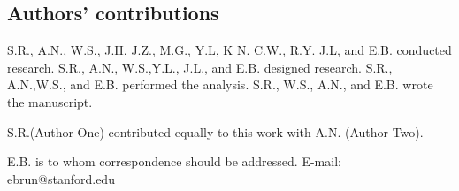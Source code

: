 \documentclass[sn-mathphys,Numbered]{sn-jnl}%
\theoremstyle{thmstyleone}%
\theoremstyle{thmstyletwo}%
\theoremstyle{thmstylethree}%
\begin{document}
\begin{appendices}
\subsection*{Authors' contributions}

S.R., A.N., W.S., J.H. J.Z., M.G., Y.L, K N. C.W., R.Y. J.L, and E.B. conducted  research. S.R., A.N., W.S.,Y.L., J.L., and E.B. designed research. S.R., A.N.,W.S., and E.B. performed the analysis. S.R., W.S., A.N., and E.B. wrote  the manuscript. 

\noindent S.R.(Author One) contributed equally to this work with A.N. (Author Two).

\noindent E.B. is to whom correspondence should be addressed. E-mail: ebrun@stanford.edu





\end{appendices}


%
\end{document}
